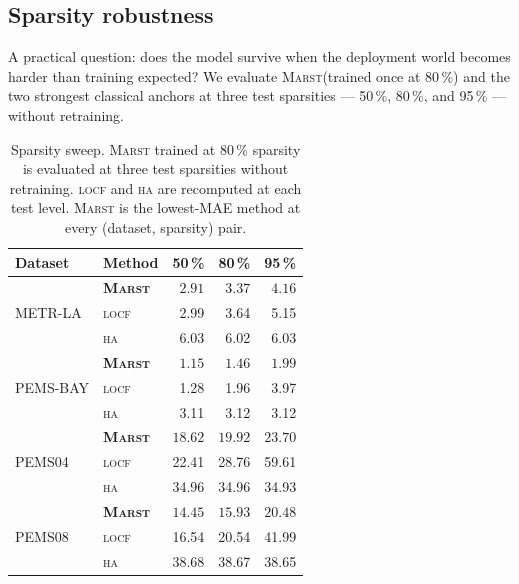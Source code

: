\documentclass[11pt]{article}
\newcommand{\MARST}{\textsc{Marst}\xspace}
\newcommand{\LOCF}{\textsc{locf}\xspace}
\newcommand{\HA}{\textsc{ha}\xspace}
\begin{document}
\subsection{Sparsity robustness}
\label{sec:results-sparsity}

A practical question: does the model survive when the deployment world
becomes harder than training expected?  We evaluate \MARST (trained
once at 80\,\%) and the two strongest classical anchors at three test
sparsities --- 50\,\%, 80\,\%, and 95\,\% --- without retraining.

\begin{table}[!htbp]
\centering
\caption{Sparsity sweep.  \MARST trained at 80\,\% sparsity is
evaluated at three test sparsities without retraining.  \LOCF and \HA
are recomputed at each test level.  \MARST is the lowest-MAE method
at every (dataset, sparsity) pair.}
\label{tab:sparsity}
\small
\begin{tabular}{llrrr}
\toprule
\textbf{Dataset} & \textbf{Method} & \textbf{50\,\%} & \textbf{80\,\%} & \textbf{95\,\%} \\
\midrule
\multirow{3}{*}{METR-LA}  & \textbf{\MARST} & $\mathbf{2.91}$  & $\mathbf{3.37}$  & $\mathbf{4.16}$ \\
                           & \LOCF           & 2.99             & 3.64             & 5.15 \\
                           & \HA             & 6.03             & 6.02             & 6.03 \\
\midrule
\multirow{3}{*}{PEMS-BAY} & \textbf{\MARST} & $\mathbf{1.15}$  & $\mathbf{1.46}$  & $\mathbf{1.99}$ \\
                           & \LOCF           & 1.28             & 1.96             & 3.97 \\
                           & \HA             & 3.11             & 3.12             & 3.12 \\
\midrule
\multirow{3}{*}{PEMS04}   & \textbf{\MARST} & $\mathbf{18.62}$ & $\mathbf{19.92}$ & $\mathbf{23.70}$ \\
                           & \LOCF           & 22.41            & 28.76            & 59.61 \\
                           & \HA             & 34.96            & 34.96            & 34.93 \\
\midrule
\multirow{3}{*}{PEMS08}   & \textbf{\MARST} & $\mathbf{14.45}$ & $\mathbf{15.93}$ & $\mathbf{20.48}$ \\
                           & \LOCF           & 16.54            & 20.54            & 41.99 \\
                           & \HA             & 38.68            & 38.67            & 38.65 \\
\bottomrule
\end{tabular}
\end{table}
\end{document}
